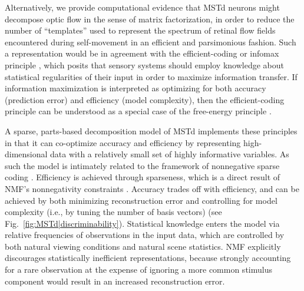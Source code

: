 Alternatively, we provide computational evidence that \ac{MSTd} neurons might decompose
optic flow in the sense of matrix factorization, in order to reduce the number of 
``templates'' used to represent the spectrum of retinal flow fields encountered during 
self-movement in an efficient and parsimonious fashion. 
Such a representation would be in agreement with the efficient-coding or infomax principle 
\citep{Attneave1954,Barlow1961,Linsker1990,SimoncelliOlshausen2001}, which posits
that sensory systems should employ knowledge about statistical regularities of their input
in order to maximize information transfer. 
If information maximization is interpreted as optimizing for both accuracy 
(prediction error) and efficiency (model complexity), then the efficient-coding principle 
can be understood as a special case of the free-energy principle 
\citep{Friston2006,Friston2010}.

A sparse, parts-based decomposition model of \ac{MSTd} implements these principles in that 
it can co-optimize accuracy and efficiency by representing high-dimensional data with a
relatively small set of highly informative variables. 
As such the model is intimately related to the framework of nonnegative sparse coding
\citep{Hoyer2002,EggertKorner2004}.
Efficiency is achieved through sparseness, which is a direct result of \ac{NMF}'s
nonnegativity constraints \citep{LeeSeung1999}. 
Accuracy trades off with efficiency, and can be achieved by both minimizing 
reconstruction error and controlling for model complexity (i.e., by tuning the number of
basis vectors) (see Fig.~\ref{fig:MSTd|discriminability}).
Statistical knowledge enters the model via relative frequencies of observations in the 
input data, which are controlled by both natural viewing conditions and natural scene
statistics. 
\ac{NMF} explicitly discourages statistically inefficient representations, because 
strongly accounting for a rare observation at the expense of ignoring a more common 
stimulus component would result in an increased reconstruction error. 

